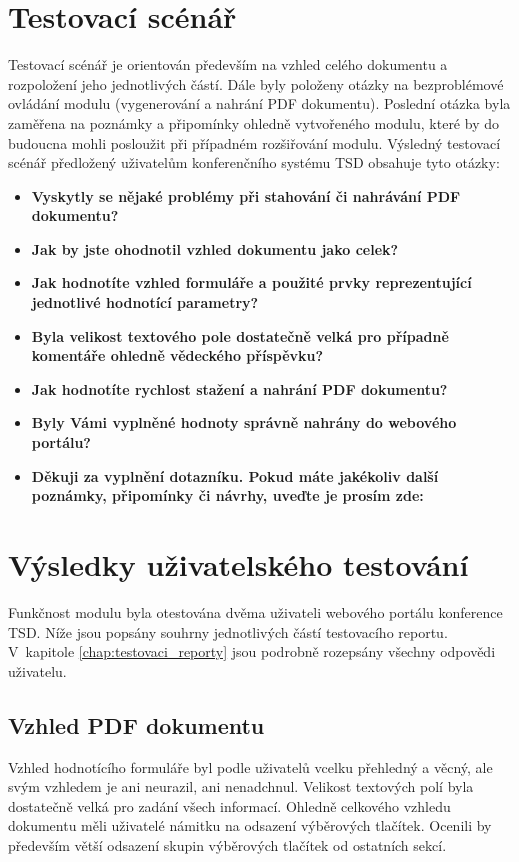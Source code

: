 \section{Testovací scénář}
Testovací scénář je orientován především na vzhled celého dokumentu a rozpoložení jeho jednotlivých částí. Dále byly položeny otázky na bezproblémové ovládání modulu (vygenerování a nahrání PDF dokumentu). Poslední otázka byla zaměřena na poznámky a připomínky ohledně vytvořeného modulu, které by do budoucna mohli posloužit při případném rozšiřování modulu.
Výsledný testovací scénář předložený uživatelům konferenčního systému TSD obsahuje tyto otázky:
\begin{itemize}
	\item \textbf{Vyskytly se nějaké problémy při stahování či nahrávání PDF dokumentu?}
	\item \textbf{Jak by jste ohodnotil vzhled dokumentu jako celek?}
	\item \textbf{Jak hodnotíte vzhled formuláře a použité prvky reprezentující jednotlivé hodnotící parametry?}
	\item \textbf{Byla velikost textového pole dostatečně velká pro případně komentáře ohledně vědeckého příspěvku?}
	\item \textbf{Jak hodnotíte rychlost stažení a nahrání PDF dokumentu?} 
	\item \textbf{Byly Vámi vyplněné hodnoty správně nahrány do webového portálu?}
	\item \textbf{Děkuji za vyplnění dotazníku. Pokud máte jakékoliv další poznámky, připomínky či návrhy, uveďte je prosím zde:}
\end{itemize}

\section{Výsledky uživatelského testování}
Funkčnost modulu byla otestována dvěma uživateli webového portálu konference TSD. Níže jsou popsány souhrny jednotlivých částí testovacího reportu. V~kapitole \ref{chap:testovaci_reporty} jsou podrobně rozepsány všechny odpovědi uživatelu.
\subsection{Vzhled PDF dokumentu}
Vzhled hodnotícího formuláře byl podle uživatelů vcelku přehledný a věcný, ale svým vzhledem je ani neurazil, ani nenadchnul. Velikost textových polí byla dostatečně velká pro zadání všech informací. Ohledně celkového vzhledu dokumentu měli uživatelé námitku na odsazení výběrových tlačítek. Ocenili by především větší odsazení skupin výběrových tlačítek od ostatních sekcí.
